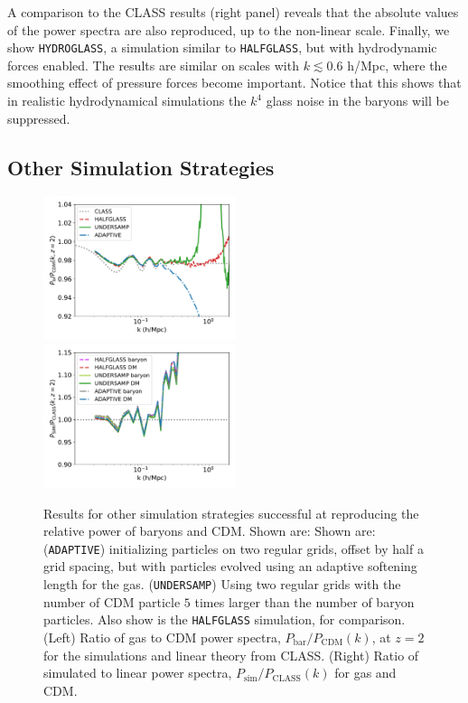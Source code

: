 \documentclass[a4paper,11pt]{article}
\begin{document}
A comparison to the CLASS results (right panel) reveals that the absolute values of the power spectra are also reproduced, up to the non-linear scale. Finally, we show \texttt{HYDROGLASS}, a simulation similar to \texttt{HALFGLASS}, but with hydrodynamic forces enabled. The results are similar on scales with $k \lesssim 0.6$ h/Mpc, where the smoothing effect of pressure forces become important. Notice that this shows that in realistic hydrodynamical simulations the $k^4$ glass noise in the baryons will be suppressed.

\subsection{Other Simulation Strategies}
\label{sec:otherstrat}

\begin{figure}
\includegraphics[width=0.5\textwidth]{plots/oversample_2_relpower.pdf}
  \includegraphics[width=0.5\textwidth]{plots/oversample_2_class.pdf}
\caption{Results for other simulation strategies successful at reproducing the relative power of baryons and CDM. Shown are:  Shown are: (\texttt{ADAPTIVE}) initializing particles on two regular grids, offset by half a grid spacing, but with particles evolved using an adaptive softening length for the gas. (\texttt{UNDERSAMP}) Using two regular grids with the number of CDM particle $5$ times larger than the number of baryon particles. Also show is the \texttt{HALFGLASS} simulation, for comparison. (Left) Ratio of gas to CDM power spectra, $P_\mathrm{bar}/P_\mathrm{CDM}(k)$, at $z=2$ for the simulations and linear theory from CLASS. (Right) Ratio of simulated to linear power spectra, $P_\mathrm{sim}/P_\mathrm{CLASS}(k)$ for gas and CDM.}
  \label{fig:adaptive}
\end{figure}
\end{document}
